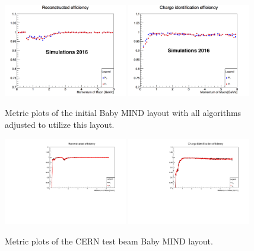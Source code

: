 \begin{figure}[h!]
\centering
\includegraphics[width=0.48\textwidth]{figures/oldStudies/oldRecEff.png}
\includegraphics[width=0.48\textwidth]{figures/oldStudies/oldChargeID.png}
\caption{Metric plots of the initial Baby MIND layout with all algorithms adjusted to utilize this layout.}
\label{fig:oldMIND2}
\end{figure}

\begin{figure}[h!]
\centering
\includegraphics[width=0.48\textwidth]{figures/oldStudies/FullFitted.pdf}
\includegraphics[width=0.48\textwidth]{figures/oldStudies/FullChargeID.pdf}
\caption{Metric plots of the CERN test beam Baby MIND layout.}
\label{fig:TestBeamMIND2}
\end{figure}


